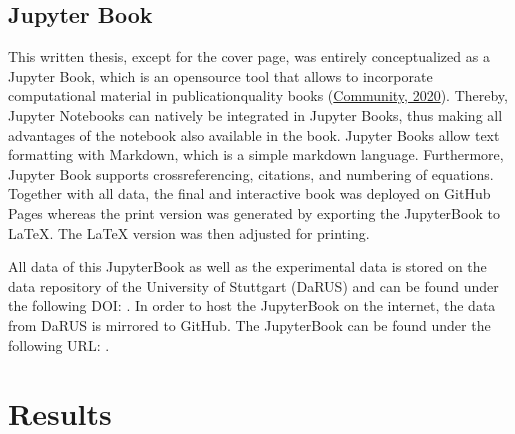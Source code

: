 \documentclass[letterpaper,12pt,english]{jupyterBook}
\begin{document}
\section{Jupyter Book}
\label{\detokenize{methods:jupyter-book}}
\sphinxAtStartPar
This written thesis, except for the cover page, was entirely conceptualized as a Jupyter Book, which is an open\sphinxhyphen{}source tool that allows to incorporate computational material in publication\sphinxhyphen{}quality books (\hyperlink{cite.references:id38}{Community, 2020}). Thereby, Jupyter Notebooks can natively be integrated in Jupyter Books, thus making all advantages of the notebook also available in the book.
Jupyter Books allow text formatting with Markdown, which is a simple markdown language. Furthermore, Jupyter Book supports cross\sphinxhyphen{}referencing, citations, and numbering of equations.
Together with all data, the final and interactive book was deployed on GitHub Pages whereas the print version was generated by exporting the JupyterBook to LaTeX. The LaTeX version was then adjusted for printing.

All data of this JupyterBook as well as the experimental data is stored on the data repository of the University of Stuttgart (DaRUS) and can be found under the following DOI:  . In order to host the JupyterBook on the internet, the data from DaRUS is mirrored to GitHub. The JupyterBook can be found under the following URL:  .


\sphinxstepscope


\chapter{Results}
\label{\detokenize{results:results}}\label{\detokenize{results::doc}}
\end{document}
